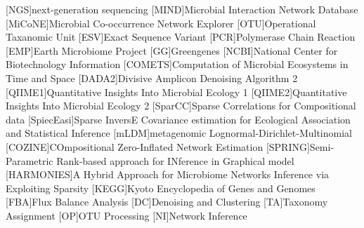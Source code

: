
\begin{acronym}[XXXXXXXX]
    [NGS]{next-generation sequencing}
    [MIND]{Microbial Interaction Network Database}
    [MiCoNE]{Microbial Co-occurrence Network Explorer}
    [OTU]{Operational Taxanomic Unit}
    [ESV]{Exact Sequence Variant}
    [PCR]{Polymerase Chain Reaction}
    [EMP]{Earth Microbiome Project}
    [GG]{Greengenes}
    [NCBI]{National Center for Biotechnology Information}
    [COMETS]{Computation of Microbial Ecosystems in Time and Space}
    [DADA2]{Divisive Amplicon Denoising Algorithm 2}
    [QIIME1]{Quantitative Insights Into Microbial Ecology 1}
    [QIIME2]{Quantitative Insights Into Microbial Ecology 2}
    [SparCC]{Sparse Correlations for Compositional data}
    [SpiecEasi]{Sparse InversE Covariance estimation for Ecological Association and Statistical Inference}
    [mLDM]{metagenomic Lognormal-Dirichlet-Multinomial}
    [COZINE]{COmpositional Zero-Inflated Network Estimation}
    [SPRING]{Semi-Parametric Rank-based approach for INference in Graphical model}
    [HARMONIES]{A Hybrid Approach for Microbiome Networks Inference via Exploiting Sparsity}
    [KEGG]{Kyoto Encyclopedia of Genes and Genomes}
    [FBA]{Flux Balance Analysis}
    [DC]{Denoising and Clustering}
    [TA]{Taxonomy Assignment}
    [OP]{OTU Processing}
    [NI]{Network Inference}
\end{acronym}
